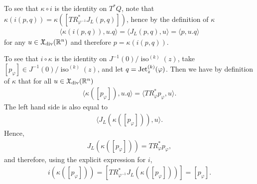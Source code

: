 \documentclass[12pt]{amsart}
\DeclareMathOperator{\iso}{iso}
\begin{document}
To see that $\kappa \circ i$ is the identity on $T^*Q$, note that $\kappa(i(p, q)) = \kappa( [ TR^*_{\varphi^{-1}} J_L(p, q)])$, hence by the definition of $\kappa$
\begin{align}
	\langle \kappa(i(p, q)), u.q \rangle = \langle J_L(p, q), u\rangle = \langle p, u.q\rangle
\end{align}
for any $u \in \mathfrak{X}_{\rm div}(\mathbb{R}^n)$ and therefore $p = \kappa(i(p, q))$. 

To see that $i \circ \kappa$ is the identity on $J^{-1}(0)/\iso^{(k)}(z)$, take $[p_\varphi] \in J^{-1}(0)/\iso^{(k)}(z)$, and let $q = {\rm Jet}^{(k)}_z(\varphi)$. Then we have by definition of $\kappa$ that for all $u \in \mathfrak{X}_{\rm div}(\mathbb{R}^n)$
\begin{align}
	\langle \kappa([p_\varphi]), u.q\rangle = \langle TR^*_\varphi p_\varphi, u\rangle.
\end{align}
The left hand side is also equal to
\begin{align}
	\langle J_L( \kappa([p_\varphi])), u\rangle.
\end{align}
Hence, 
\begin{align}
	J_L( \kappa([p_\varphi])) = TR^*_\varphi p_\varphi,
\end{align}
and therefore, using the explicit expression for $i$,
\begin{align}
	i(\kappa([p_\varphi])) = [ TR^*_{\varphi^{-1}} J_L( \kappa([p_\varphi])) ] = [p_\varphi].
\end{align}














\end{document}
